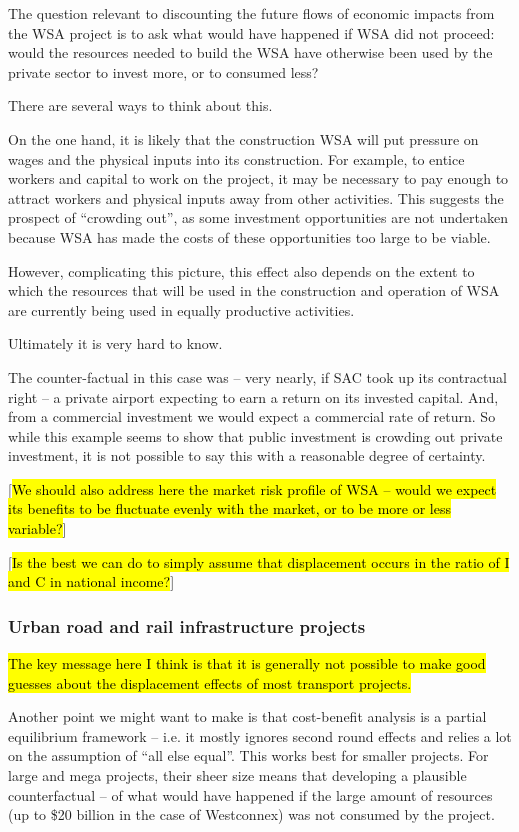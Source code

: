 The question relevant to discounting the future flows of economic impacts from the WSA project is to ask what would have happened if WSA did not proceed: would the resources needed to build the WSA have otherwise been used by the private sector to invest more, or to consumed less? 

There are several ways to think about this. 

On the one hand, it is likely that the construction WSA will put pressure on wages and the physical inputs into its construction. For example, to entice workers and capital to work on the project, it may be necessary to pay enough to attract workers and physical inputs away from other activities. This suggests the prospect of ``crowding out'', as some investment opportunities are not undertaken because WSA has made the costs of these opportunities too large to be viable.  

However, complicating this picture, this effect also depends on the extent to which the resources that will be used in the construction and operation of WSA are currently being used in equally productive activities. 

Ultimately it is very hard to know.  

The counter-factual in this case was – very nearly, if SAC took up its contractual right – a private airport expecting to earn a return on its invested capital. And, from a commercial investment we would expect a commercial rate of return. So while this example seems to show that public investment is crowding out private investment, it is not possible to say this with a reasonable degree of certainty.


[\hl{We should also address here the market risk profile of WSA -- would we expect its benefits to be fluctuate evenly with the market, or to be more or less variable?}]

[\hl{Is the best we can do to simply assume that displacement occurs in the ratio of I and C in national income?}]

\subsubsection{Urban road and rail infrastructure projects}
\hl{The key message here I think is that it is generally not possible to make good guesses about the displacement effects of most transport projects.}

Another point we might want to make is that cost-benefit analysis is a partial equilibrium framework -- i.e. it mostly ignores second round effects and relies a lot on the assumption of ``all else equal''. This works best for smaller projects. For large and mega projects, their sheer size means that developing a plausible counterfactual -- of what would have happened if the large amount of resources (up to \$20 billion in the case of Westconnex) was not consumed by the project. 

